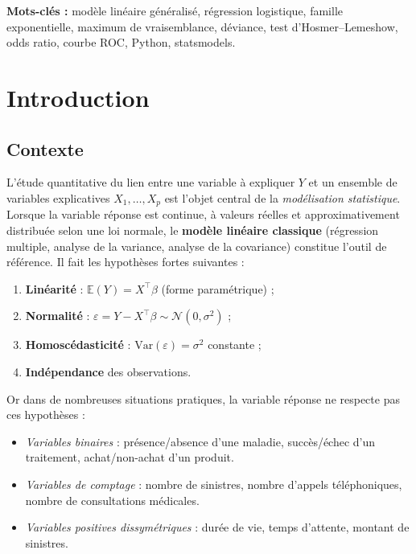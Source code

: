 \documentclass[11pt,a4paper,twoside]{report}
\newcommand{\E}{\mathbb{E}}
\newcommand{\Var}{\mathrm{Var}}
\theoremstyle{definition}
\begin{document}
\bigskip
\noindent\textbf{Mots-clés :} modèle linéaire généralisé, régression
logistique, famille exponentielle, maximum de vraisemblance, déviance,
test d'Hosmer--Lemeshow, odds ratio, courbe ROC, Python, statsmodels.

\tableofcontents
\listoffigures
{}
\listoftables
{}

\cleardoublepage

\chapter{Introduction}

\section{Contexte}

L'étude quantitative du lien entre une variable à expliquer $Y$ et un
ensemble de variables explicatives $X_1,\ldots,X_p$ est l'objet central
de la \emph{modélisation statistique}. Lorsque la variable réponse est
continue, à valeurs réelles et approximativement distribuée selon une
loi normale, le \textbf{modèle linéaire classique} (régression multiple,
analyse de la variance, analyse de la covariance) constitue l'outil de
référence. Il fait les hypothèses fortes suivantes :

\begin{enumerate}\itemsep0.2em
  \item \textbf{Linéarité} : $\E(Y) = X^\top\beta$ (forme paramétrique) ;
  \item \textbf{Normalité} : $\varepsilon = Y - X^\top\beta \sim \mathcal{N}(0,\sigma^2)$ ;
  \item \textbf{Homoscédasticité} : $\Var(\varepsilon) = \sigma^2$ constante ;
  \item \textbf{Indépendance} des observations.
\end{enumerate}

Or dans de nombreuses situations pratiques, la variable réponse ne
respecte pas ces hypothèses :

\begin{itemize}\itemsep0.2em
  \item \emph{Variables binaires} : présence/absence d'une maladie,
    succès/échec d'un traitement, achat/non-achat d'un produit.
  \item \emph{Variables de comptage} : nombre de sinistres, nombre
    d'appels téléphoniques, nombre de consultations médicales.
  \item \emph{Variables positives dissymétriques} : durée de vie, temps
    d'attente, montant de sinistres.
\end{itemize}
\end{document}
